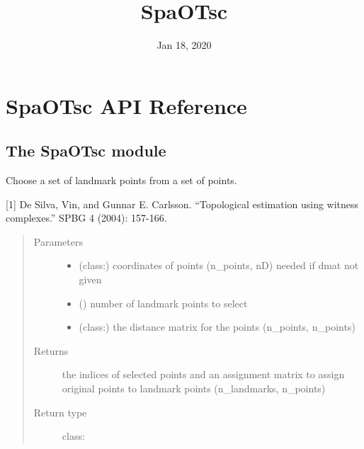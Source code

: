 \documentclass[letterpaper,10pt,english]{sphinxmanual}
\title{SpaOTsc}
\date{Jan 18, 2020}
\author{}
\begin{document}
\maketitle
\sphinxtableofcontents
{}\label{\detokenize{index::doc}}



\chapter{SpaOTsc API Reference}
\label{\detokenize{api:module-spaotsc}}\label{\detokenize{api:spaotsc-api-reference}}\label{\detokenize{api::doc}}\label{\detokenize{api:welcome-to-spaotsc-s-documentation}}

\section{The SpaOTsc module}
\label{\detokenize{api:module-spaotsc.SpaOTsc}}\label{\detokenize{api:the-spaotsc-module}}

\begin{fulllineitems}
\label{\detokenize{api:spaotsc.SpaOTsc.choose_landmarks}}
Choose a set of landmark points from a set of points.

{[}1{]} De Silva, Vin, and Gunnar E. Carlsson. “Topological estimation using
witness complexes.” SPBG 4 (2004): 157-166.
\begin{quote}\begin{description}
\item[{Parameters}] \leavevmode\begin{itemize}
\item {} 
 (class:) \textendash{} coordinates of points (n\_points, nD) needed if dmat not given

\item {} 
 () \textendash{} number of landmark points to select

\item {} 
 (class:) \textendash{} the distance matrix for the points (n\_points, n\_points)

\end{itemize}

\item[{Returns}] \leavevmode
the indices of selected points and an assignment matrix to assign original points to landmark points (n\_landmarks, n\_points)

\item[{Return type}] \leavevmode
class:

\end{description}\end{quote}

\end{fulllineitems}
\end{document}

